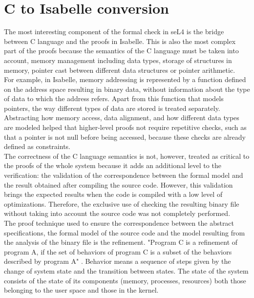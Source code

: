 \documentclass[conference]{IEEEtran}
\begin{document}
\section{C to Isabelle conversion}
The most interesting component of the formal check in seL4 is the bridge between C language and the proofs in Isabelle. This is also the most complex part of the proofs because the semantics of the C language must be taken into account, memory management including data types, storage of structures in memory, pointer cast between different data structures or pointer arithmetic. \\
For example, in Isabelle, memory addressing is represented by a function defined on the address space resulting in binary data, without information about the type of data to which the address refers. Apart from this function that models pointers, the way different types of data are stored is treated separately. \cite{tuch} Abstracting how memory access, data alignment, and how different data types are modeled helped that higher-level proofs not require repetitive checks, such as that a pointer is not null before being accessed, because these checks are already defined as constraints.\\
The correctness of the C language semantics is not, however, treated as critical to the proofs of the whole system because it adds an additional level to the verification: the validation of the correspondence between the formal model and the result obtained after compiling the source code. However, this validation brings the expected results when the code is compiled with a low level of optimizations. Therefore, the exclusive use of checking the resulting binary file without taking into account the source code was not completely performed.\\
The proof technique used to ensure the correspondence between the abstract specifications, the formal model of the source code and the model resulting from the analysis of the binary file is the refinement. "Program C is a refinement of program A, if the set of behaviors of program C is a subset of the behaviors described by program A" \cite{verifos}. Behavior means a sequence of steps given by the change of system state and the transition between states. The state of the system consists of the state of its components (memory, processes, resources) both those belonging to the user space and those in the kernel.
\end{document}

